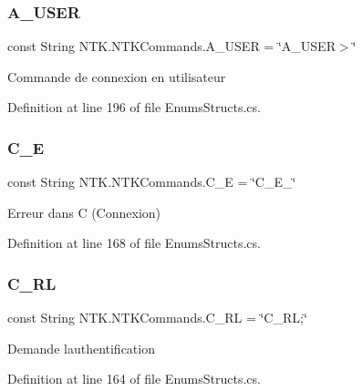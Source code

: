 \subsubsection{\texorpdfstring{A\_USER}{A\_USER}}
{\footnotesize\ttfamily const String N\+T\+K.\+N\+T\+K\+Commands.\+A\+\_\+\+U\+S\+ER = \char`\"{}A\+\_\+\+U\+S\+ER$>$\char`\"{}}



Commande de connexion en utilisateur 



Definition at line 196 of file Enums\+Structs.\+cs.

\mbox{\label{struct_n_t_k_1_1_n_t_k_commands_afddbc3ecb4de8ef92dba66c6bd737192}} 
\subsubsection{\texorpdfstring{C\_E}{C\_E}}
{\footnotesize\ttfamily const String N\+T\+K.\+N\+T\+K\+Commands.\+C\+\_\+E = \char`\"{}C\+\_\+\+E\+\_\+\char`\"{}}



Erreur dans C (Connexion) 



Definition at line 168 of file Enums\+Structs.\+cs.

\mbox{\label{struct_n_t_k_1_1_n_t_k_commands_a8096d82430bea3a0e9f116c9a46cbe5d}} 
\subsubsection{\texorpdfstring{C\_RL}{C\_RL}}
{\footnotesize\ttfamily const String N\+T\+K.\+N\+T\+K\+Commands.\+C\+\_\+\+RL = \char`\"{}C\+\_\+\+RL;\char`\"{}}



Demande l\textquotesingle{}authentification 



Definition at line 164 of file Enums\+Structs.\+cs.

\mbox{\label{struct_n_t_k_1_1_n_t_k_commands_a96c5ba1d63303e8975f8f6ed9ab50c02}} 
